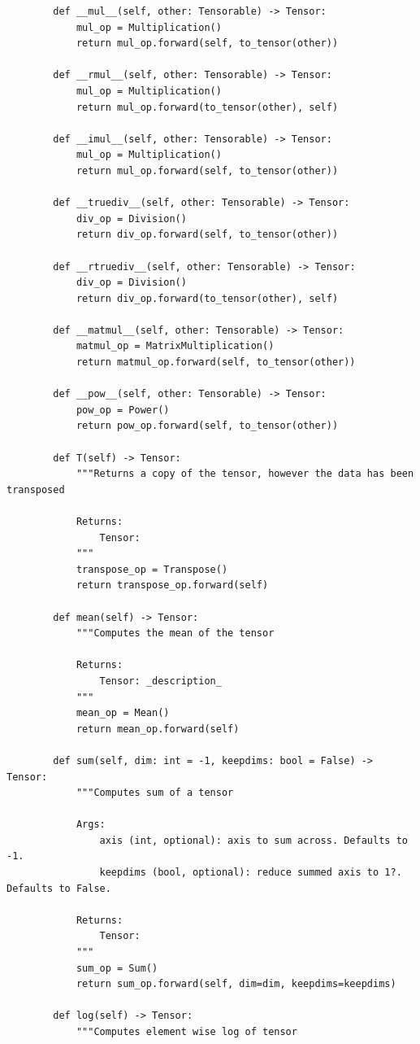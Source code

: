 \documentclass{article}
\begin{document}
\begin{verbatim}
        def __mul__(self, other: Tensorable) -> Tensor:
            mul_op = Multiplication()
            return mul_op.forward(self, to_tensor(other))

        def __rmul__(self, other: Tensorable) -> Tensor:
            mul_op = Multiplication()
            return mul_op.forward(to_tensor(other), self)

        def __imul__(self, other: Tensorable) -> Tensor:
            mul_op = Multiplication()
            return mul_op.forward(self, to_tensor(other))

        def __truediv__(self, other: Tensorable) -> Tensor:
            div_op = Division()
            return div_op.forward(self, to_tensor(other))

        def __rtruediv__(self, other: Tensorable) -> Tensor:
            div_op = Division()
            return div_op.forward(to_tensor(other), self)

        def __matmul__(self, other: Tensorable) -> Tensor:
            matmul_op = MatrixMultiplication()
            return matmul_op.forward(self, to_tensor(other))

        def __pow__(self, other: Tensorable) -> Tensor:
            pow_op = Power()
            return pow_op.forward(self, to_tensor(other))

        def T(self) -> Tensor:
            """Returns a copy of the tensor, however the data has been transposed

            Returns:
                Tensor:
            """
            transpose_op = Transpose()
            return transpose_op.forward(self)

        def mean(self) -> Tensor:
            """Computes the mean of the tensor

            Returns:
                Tensor: _description_
            """
            mean_op = Mean()
            return mean_op.forward(self)

        def sum(self, dim: int = -1, keepdims: bool = False) -> Tensor:
            """Computes sum of a tensor

            Args:
                axis (int, optional): axis to sum across. Defaults to -1.
                keepdims (bool, optional): reduce summed axis to 1?. Defaults to False.

            Returns:
                Tensor:
            """
            sum_op = Sum()
            return sum_op.forward(self, dim=dim, keepdims=keepdims)

        def log(self) -> Tensor:
            """Computes element wise log of tensor


\end{verbatim}
\end{document}
